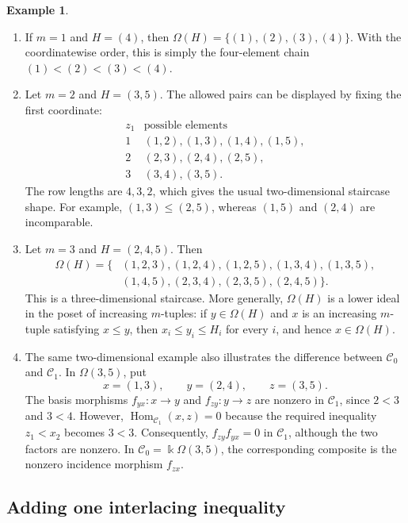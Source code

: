 \documentclass[12pt,a4paper,english,reqno]{amsart}
\theoremstyle{plain}
\theoremstyle{definition}
\newtheorem{exm}[theorem]{Example}
\newcommand{\kk}{\Bbbk}
\newcommand{\Hom}{\operatorname{Hom}}
\newcommand{\C}{\mathcal C}
\begin{document}
\begin{exm}
    

\begin{enumerate}
\item If $m=1$ and $H=(4)$, then $\Omega(H)=\{(1),(2),(3),(4)\}.$
With the coordinatewise order, this is simply the four-element chain
$(1)<(2)<(3)<(4)$.

\item Let $m=2$ and $H=(3,5)$.  The allowed pairs can be displayed by fixing
the first coordinate:
\[
\begin{array}{c|l}
 z_1&\text{possible elements}\\
 \hline
 1&(1,2),(1,3),(1,4),(1,5),\\
 2&(2,3),(2,4),(2,5),\\
 3&(3,4),(3,5).
\end{array}
\]
The row lengths are $4,3,2$, which gives the usual two-dimensional
staircase shape.  For example, $(1,3)\leq(2,5)$, whereas $(1,5)$ and
$(2,4)$ are incomparable.

\item Let $m=3$ and $H=(2,4,5)$.  Then
\[
\begin{aligned}
 \Omega(H)=\{& (1,2,3),(1,2,4),(1,2,5),
 (1,3,4),(1,3,5),\\
 & (1,4,5),(2,3,4),(2,3,5),(2,4,5)\}.
\end{aligned}
\]
This is a three-dimensional staircase.  More generally, $\Omega(H)$ is a
lower ideal in the poset of increasing $m$-tuples: if $y\in\Omega(H)$ and
$x$ is an increasing $m$-tuple satisfying $x\leq y$, then
$x_i\leq y_i\leq H_i$ for every $i$, and hence $x\in\Omega(H)$.

\item The same two-dimensional example also illustrates the difference
between $\C_0$ and $\C_1$.  In $\Omega(3,5)$, put
\[
 x=(1,3),\qquad y=(2,4),\qquad z=(3,5).
\]
The basis morphisms $f_{yx}\colon x\to y$ and
$f_{zy}\colon y\to z$ are nonzero in $\C_1$, since
$2<3$ and $3<4$.  However, $\Hom_{\C_1}(x,z)=0$
because the required inequality $z_1<x_2$ becomes $3<3$.
Consequently, $f_{zy}f_{yx}=0$ in $\C_1$, although the two factors are
nonzero.  In $\C_0=\kk\Omega(3,5)$, the corresponding composite is the
nonzero incidence morphism $f_{zx}$.
\end{enumerate}
\end{exm}





\subsection{Adding one interlacing inequality}
\end{document}
